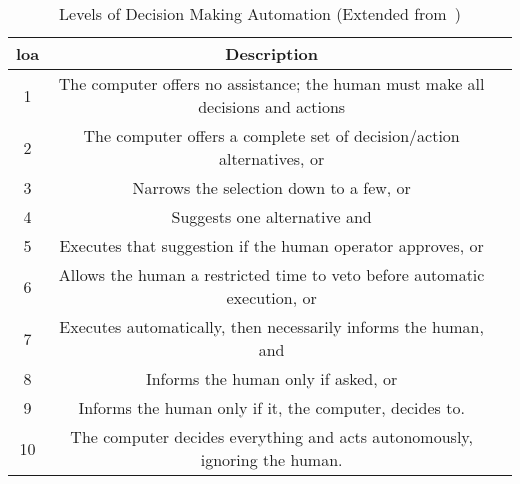 \begin{table}\centering
  \caption[Levels of Decision Making Automation]{Levels of Decision Making Automation (Extended from~\citet{Sheridan1978})}
  \label{tab:autonomy_levels_sheridan}
  \begin{tabularx}{\textwidth}{c c X}\toprule
    \gls{loa} & Description \\ \midrule
    1&    The computer offers no assistance; the human must make all decisions and actions\\
    2&    The computer offers a complete set of decision/action alternatives, or\\
    3&    Narrows the selection down to a few, or\\
    4&    Suggests one alternative and\\
    5&    Executes that suggestion if the human operator approves, or\\
    6&    Allows the human a restricted time to veto before automatic execution, or\\
    7&    Executes automatically, then necessarily informs the human, and\\
    8&    Informs the human only if asked, or\\
    9&    Informs the human only if it, the computer, decides to.\\
    10&   The computer decides everything and acts autonomously, ignoring the human.\\\bottomrule
  \end{tabularx}
\end{table}

